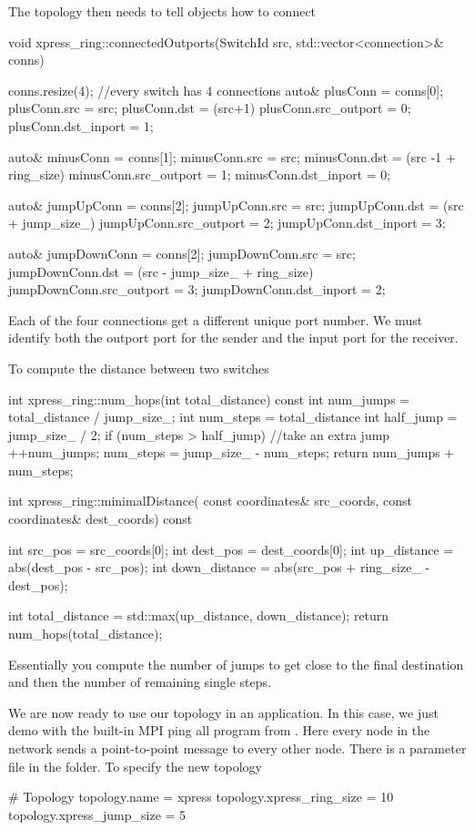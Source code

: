 The topology then needs to tell objects how to connect

\begin{CppCode}
void xpress_ring::connectedOutports(SwitchId src, std::vector<connection>& conns)
{
  conns.resize(4); //every switch has 4 connections
  auto& plusConn = conns[0];
  plusConn.src = src;
  plusConn.dst = (src+1) %
  plusConn.src_outport = 0;
  plusConn.dst_inport = 1; 
  
  auto& minusConn = conns[1];
  minusConn.src = src;
  minusConn.dst = (src -1 + ring_size) %
  minusConn.src_outport = 1;
  minusConn.dst_inport = 0;   
  
  auto& jumpUpConn = conns[2];
  jumpUpConn.src = src;
  jumpUpConn.dst = (src + jump_size_) %
  jumpUpConn.src_outport = 2;
  jumpUpConn.dst_inport = 3;
  
  auto& jumpDownConn = conns[2];
  jumpDownConn.src = src;
  jumpDownConn.dst = (src - jump_size_ + ring_size) %
  jumpDownConn.src_outport = 3;
  jumpDownConn.dst_inport = 2;
}
\end{CppCode}
Each of the four connections get a different unique port number.  
We must identify both the outport port for the sender and the input port for the receiver.

To compute the distance between two switches

\begin{CppCode}
int xpress_ring::num_hops(int total_distance) const
{
  int num_jumps = total_distance / jump_size_;
  int num_steps = total_distance %
  int half_jump = jump_size_ / 2;
  if (num_steps > half_jump) {
    //take an extra jump
    ++num_jumps;
    num_steps = jump_size_ - num_steps;
  }
  return num_jumps + num_steps;
}

int
xpress_ring::minimalDistance(
  const coordinates& src_coords,
  const coordinates& dest_coords) const
{
  int src_pos = src_coords[0];
  int dest_pos = dest_coords[0];
  int up_distance = abs(dest_pos - src_pos);
  int down_distance = abs(src_pos + ring_size_ - dest_pos);

  int total_distance = std::max(up_distance, down_distance);
  return num_hops(total_distance);
}
\end{CppCode}
Essentially you compute the number of jumps to get close to the final destination and then the number of remaining single steps.

We are now ready to use our topology in an application.
In this case, we just demo with the built-in MPI ping all program from \sstmacro.
Here every node in the network sends a point-to-point message to every other node.
There is a parameter file in the  folder.
To specify the new topology

\begin{ViFile}
# Topology
topology.name = xpress
topology.xpress_ring_size = 10
topology.xpress_jump_size = 5
\end{ViFile}



